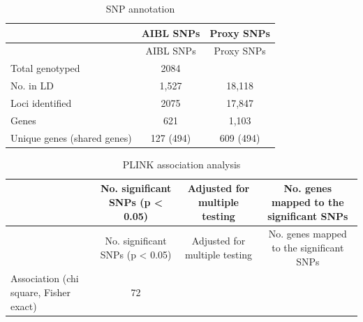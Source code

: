 \documentclass[]{article}
\begin{document}
\begin{longtable}[]{@{}lcc@{}}
\caption{SNP annotation}\tabularnewline
\toprule
& AIBL SNPs & Proxy SNPs\tabularnewline
\midrule
\endfirsthead
\toprule
& AIBL SNPs & Proxy SNPs\tabularnewline
\midrule
\endhead
Total genotyped & 2084 &\tabularnewline
No. in LD & 1,527 & 18,118\tabularnewline
Loci identified & 2075 & 17,847\tabularnewline
Genes & 621 & 1,103\tabularnewline
Unique genes (shared genes) & 127 (494) & 609 (494)\tabularnewline
\bottomrule
\end{longtable}

\begin{longtable}[]{@{}lccc@{}}
\caption{PLINK association analysis}\tabularnewline
\toprule
\begin{minipage}[b]{0.28\columnwidth}\raggedright\strut
\strut
\end{minipage} & \begin{minipage}[b]{0.19\columnwidth}\centering\strut
No. significant SNPs (p \textless{} 0.05)\strut
\end{minipage} & \begin{minipage}[b]{0.24\columnwidth}\centering\strut
Adjusted for multiple testing\strut
\end{minipage} & \begin{minipage}[b]{0.18\columnwidth}\centering\strut
No. genes mapped to the significant SNPs\strut
\end{minipage}\tabularnewline
\midrule
\endfirsthead
\toprule
\begin{minipage}[b]{0.28\columnwidth}\raggedright\strut
\strut
\end{minipage} & \begin{minipage}[b]{0.19\columnwidth}\centering\strut
No. significant SNPs (p \textless{} 0.05)\strut
\end{minipage} & \begin{minipage}[b]{0.24\columnwidth}\centering\strut
Adjusted for multiple testing\strut
\end{minipage} & \begin{minipage}[b]{0.18\columnwidth}\centering\strut
No. genes mapped to the significant SNPs\strut
\end{minipage}\tabularnewline
\midrule
\endhead
\begin{minipage}[t]{0.28\columnwidth}\raggedright\strut
Association (chi square, Fisher exact)\strut
\end{minipage} & \begin{minipage}[t]{0.19\columnwidth}\centering\strut
72\strut
\end{minipage} & \begin{minipage}[t]{0.24\columnwidth}\centering\strut

\end{minipage}
\end{longtable}
\end{document}
